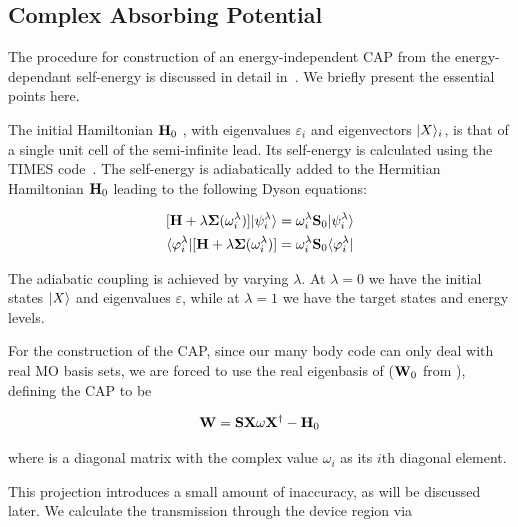 \subsection{Complex Absorbing Potential}
\label{subsec:CAP}

The procedure for construction of an energy-independent \ac{CAP} from the
energy-dependant self-energy is discussed in detail in~\cite{henderson}. We
briefly present the essential points here.

The initial Hamiltonian $\mathbf{H}_0$ , with eigenvalues $\varepsilon_i$ and
eigenvectors $|X \rangle_i$, is that of a single unit cell of the semi-infinite
lead. Its self-energy is calculated using the TIMES code~\cite{times}. The
self-energy is adiabatically added to the Hermitian Hamiltonian $\mathbf{H}_0$
leading to the following Dyson equations:

\begin{subequations}
\begin{align}
	[\mathbf{H} + \lambda \mathbf{\Sigma}(\omega_i^\lambda)] |\psi_i^\lambda \rangle
	&= \omega_i^\lambda \mathbf{S}_0 |\psi_i^\lambda \rangle \\
	\langle \varphi_i^\lambda| [\mathbf{H} + \lambda \mathbf{\Sigma}(\omega_i^\lambda)]
	&= \omega_i^\lambda \mathbf{S}_0 \langle \varphi_i^\lambda| 
	\label{eq:adiabaticap}
\end{align}
\end{subequations}

The adiabatic coupling is achieved by varying $\lambda$. At $\lambda = 0$ we
have the initial states $|X \rangle$ and eigenvalues $\varepsilon$, while at
$\lambda = 1$ we have the target states and energy levels.

For the construction of the \ac{CAP}, since our many body code can only deal
with real MO basis sets, we are forced to use the real eigenbasis of 
($\mathbf{W}_0$ from \cite{henderson}), defining the \ac{CAP} to be

\begin{equation}
	\mathbf{W} = \mathbf{S}\mathbf{X}\mathbf{\omega}\mathbf{X}^\dagger - \mathbf{H}_0
	\label{eq:capsdef}
\end{equation}

where \umm{\omega} is a diagonal matrix with the complex value $\omega_i$ as
its $i$th diagonal element.

This projection introduces a small amount of inaccuracy, as will be discussed
later. We calculate the transmission through the device region via

